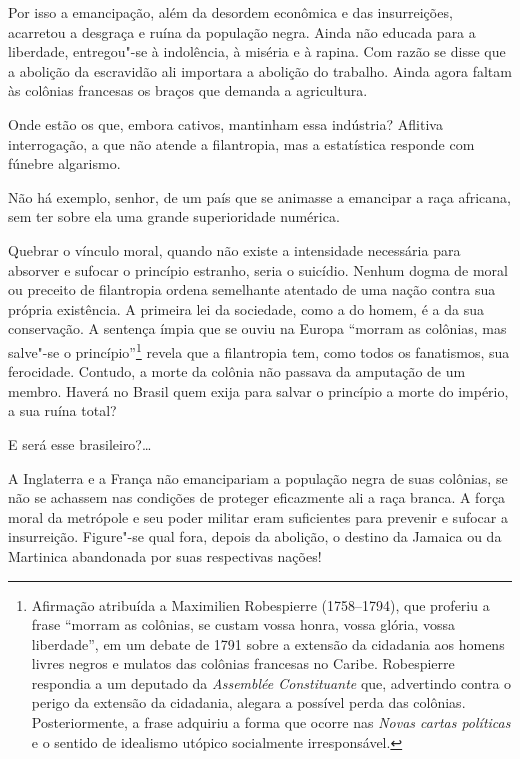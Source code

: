 Por isso a emancipação, além da desordem econômica e das insurreições,
acarretou a desgraça e ruína da população negra. Ainda não educada para
a liberdade, entregou"-se à indolência, à miséria e à rapina. Com
razão se disse que a abolição da escravidão ali importara a abolição do
trabalho. Ainda agora faltam às colônias francesas os braços que
demanda a agricultura.

Onde estão os que, embora cativos, mantinham essa indústria? Aflitiva
interrogação, a que não atende a filantropia, mas a estatística
responde com fúnebre algarismo. 

\sectionitem

Não há exemplo, senhor, de um país que se animasse a emancipar a raça
africana, sem ter sobre ela uma grande superioridade numérica.

Quebrar o vínculo moral, quando não existe a intensidade necessária para
absorver e sufocar o princípio estranho, seria o suicídio. Nenhum dogma
de moral ou preceito de filantropia ordena semelhante atentado de uma
nação contra sua própria existência. A primeira lei da sociedade, como
a do homem, é a da sua conservação. A sentença ímpia que se ouviu na
Europa ``morram as colônias, mas salve"-se o
princípio''\footnote{ Afirmação atribuída a Maximilien Robespierre (1758--1794), que
proferiu a frase ``morram as colônias, se custam vossa honra, vossa
glória, vossa liberdade'', em um debate de 1791 sobre a extensão da
cidadania aos homens livres negros e mulatos das colônias francesas no
Caribe. Robespierre respondia a um deputado da \textit{Assemblée Constituante} 
que, advertindo contra o perigo da extensão da
cidadania, alegara a possível perda das colônias. Posteriormente, a
frase adquiriu a forma que ocorre nas \textit{Novas cartas políticas} e
o sentido de idealismo utópico socialmente irresponsável.}
 revela que a filantropia tem, como todos os fanatismos, sua ferocidade.
Contudo, a morte da colônia não passava da amputação de um membro.
Haverá no Brasil quem exija para salvar o princípio a morte do império, a sua ruína total?

E será esse brasileiro?\ldots{}

A Inglaterra e a França não emancipariam a população negra de suas
colônias, se não se achassem nas condições de proteger eficazmente ali
a raça branca. A força moral da metrópole e seu poder militar eram
suficientes para prevenir e sufocar a insurreição. Figure"-se qual
fora, depois da abolição, o destino da Jamaica ou da Martinica
abandonada por suas respectivas nações!

